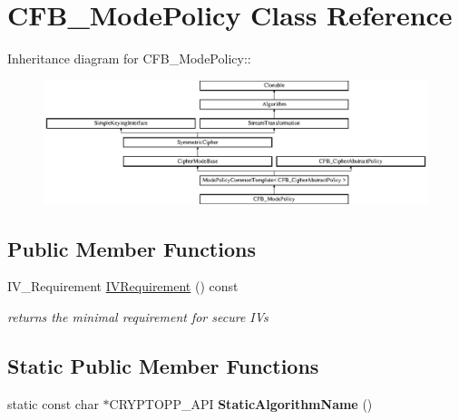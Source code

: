 \hypertarget{class_c_f_b___mode_policy}{
\section{CFB\_\-ModePolicy Class Reference}
\label{class_c_f_b___mode_policy}
}
Inheritance diagram for CFB\_\-ModePolicy::\begin{figure}[H]
\begin{center}
\leavevmode
\includegraphics[height=3.61958cm]{class_c_f_b___mode_policy}
\end{center}
\end{figure}
\subsection*{Public Member Functions}
\begin{DoxyCompactItemize}
\item 
\hypertarget{class_c_f_b___mode_policy_a7f2ddc303436b365a6b5d3bcb6d8142e}{
IV\_\-Requirement \hyperlink{class_c_f_b___mode_policy_a7f2ddc303436b365a6b5d3bcb6d8142e}{IVRequirement} () const }
\label{class_c_f_b___mode_policy_a7f2ddc303436b365a6b5d3bcb6d8142e}

\begin{DoxyCompactList}\small\item\em returns the minimal requirement for secure IVs \item\end{DoxyCompactList}\end{DoxyCompactItemize}
\subsection*{Static Public Member Functions}
\begin{DoxyCompactItemize}
\item 
\hypertarget{class_c_f_b___mode_policy_a3ac42361b53bf0e19ce28f4b08be7628}{
static const char $\ast$CRYPTOPP\_\-API {\bfseries StaticAlgorithmName} ()}
\label{class_c_f_b___mode_policy_a3ac42361b53bf0e19ce28f4b08be7628}

\end{DoxyCompactItemize}
